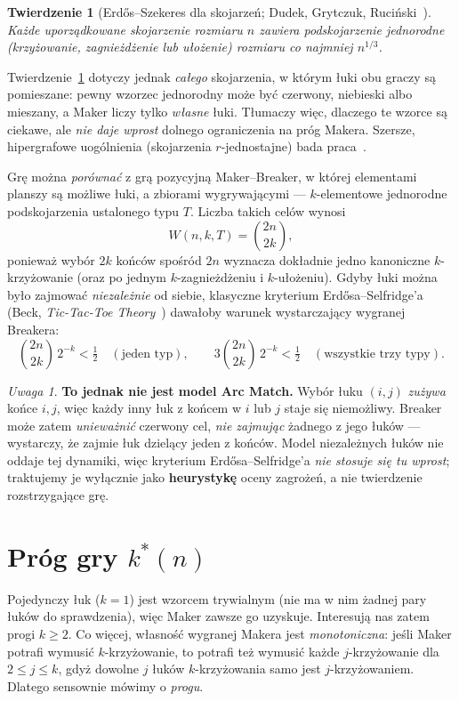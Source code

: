 \documentclass[11pt]{article}
\theoremstyle{definition}
\theoremstyle{plain}
\newtheorem{twierdzenie}{Twierdzenie}[section]
\theoremstyle{remark}
\newtheorem*{uwaga}{Uwaga}
\begin{document}
\begin{twierdzenie}[Erdős--Szekeres dla skojarzeń; Dudek, Grytczuk, Ruciński~\cite{dgr-unavoidable}]
\label{tw:es}
Każde uporządkowane skojarzenie rozmiaru $n$ zawiera podskojarzenie jednorodne (krzyżowanie,
zagnieżdżenie lub ułożenie) rozmiaru co najmniej $n^{1/3}$.
\end{twierdzenie}

Twierdzenie~\ref{tw:es} dotyczy jednak \emph{całego} skojarzenia, w którym łuki obu graczy są
pomieszane: pewny wzorzec jednorodny może być czerwony, niebieski albo mieszany, a Maker liczy tylko
\emph{własne} łuki. Tłumaczy więc, dlaczego te wzorce są ciekawe, ale \emph{nie daje wprost} dolnego
ograniczenia na próg Makera. Szersze, hipergrafowe uogólnienia (skojarzenia $r$-jednostajne) bada
praca~\cite{dgr-eszekeres}.

Grę można \emph{porównać} z grą pozycyjną Maker--Breaker, w której elementami planszy są możliwe łuki,
a zbiorami wygrywającymi --- $k$-elementowe jednorodne podskojarzenia ustalonego typu $T$. Liczba takich
celów wynosi
\[
W(n,k,T) = \binom{2n}{2k},
\]
ponieważ wybór $2k$ końców spośród $2n$ wyznacza dokładnie jedno kanoniczne $k$-krzyżowanie (oraz po
jednym $k$-zagnieżdżeniu i $k$-ułożeniu). Gdyby łuki można było zajmować \emph{niezależnie} od siebie,
klasyczne kryterium Erdősa--Selfridge'a (Beck, \emph{Tic-Tac-Toe Theory}~\cite{beck})
dawałoby warunek wystarczający wygranej Breakera:
\[
\binom{2n}{2k}\,2^{-k} < \tfrac12 \quad(\text{jeden typ}), \qquad
3\binom{2n}{2k}\,2^{-k} < \tfrac12 \quad(\text{wszystkie trzy typy}).
\]

\begin{uwaga}
\textbf{To jednak nie jest model Arc Match.} Wybór łuku $(i,j)$ \emph{zużywa} końce $i,j$, więc każdy
inny łuk z końcem w $i$ lub $j$ staje się niemożliwy. Breaker może zatem \emph{unieważnić} czerwony
cel, \emph{nie zajmując} żadnego z jego łuków --- wystarczy, że zajmie łuk dzielący jeden z końców.
Model niezależnych łuków nie oddaje tej dynamiki, więc kryterium Erdősa--Selfridge'a \emph{nie stosuje
się tu wprost}; traktujemy je wyłącznie jako \textbf{heurystykę} oceny zagrożeń, a nie twierdzenie
rozstrzygające grę.
\end{uwaga}

\section{Próg gry $k^*(n)$}

Pojedynczy łuk ($k=1$) jest wzorcem trywialnym (nie ma w nim żadnej pary łuków do sprawdzenia), więc
Maker zawsze go uzyskuje. Interesują nas zatem progi $k\ge 2$. Co więcej, własność wygranej Makera jest
\emph{monotoniczna}: jeśli Maker potrafi wymusić $k$-krzyżowanie, to potrafi też wymusić każde
$j$-krzyżowanie dla $2\le j\le k$, gdyż dowolne $j$ łuków $k$-krzyżowania samo jest $j$-krzyżowaniem.
Dlatego sensownie mówimy o \emph{progu}.
\end{document}
